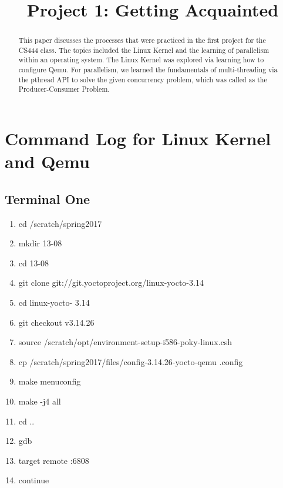 \documentclass[letterpaper,10pt,draftclsnofoot,onecolumn]{IEEEtran}
\begin{document}
\title{Project 1: Getting Acquainted}

\author{
}

\maketitle
\begin{abstract}
This paper discusses the processes that were practiced in the first project for the CS444
class. The topics included the Linux Kernel and the learning of parallelism within an operating 
system. The Linux Kernel was explored via learning how to configure Qemu. For parallelism, we
learned the fundamentals of multi-threading via the pthread API to solve the given concurrency problem,
which was called as the Producer-Consumer Problem. 
\end{abstract}
\pagebreak

\section{Command Log for Linux Kernel and Qemu}
\subsection{Terminal One}
\begin{enumerate}
\item cd /scratch/spring2017
\item mkdir 13-08
\item cd 13-08
\item git clone git://git.yoctoproject.org/linux-yocto-3.14
\item cd linux-yocto- 3.14
\item git checkout v3.14.26
\item source /scratch/opt/environment-setup-i586-poky-linux.csh
\item cp /scratch/spring2017/files/config-3.14.26-yocto-qemu .config
\item make menuconfig
\item make -j4 all
\item cd ..
\item gdb
\item target remote :6808
\item continue
\end{enumerate}
\end{document}
